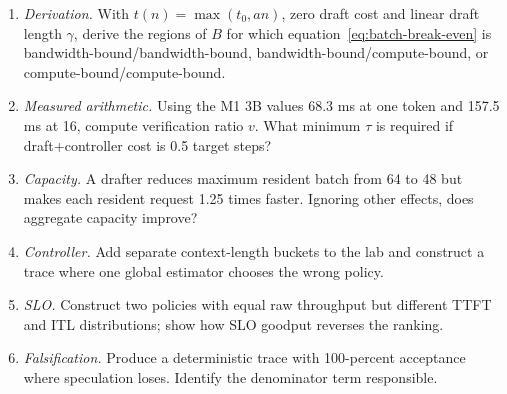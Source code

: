 \ExercisesSection
\begin{enumerate}
\item \emph{Derivation.} With $t(n)=\max(t_0,an)$, zero draft cost and linear draft
length $\gamma$, derive the regions of $B$ for which equation~\eqref{eq:batch-break-even}
is bandwidth-bound/bandwidth-bound, bandwidth-bound/compute-bound, or
compute-bound/compute-bound.
\item \emph{Measured arithmetic.} Using the M1 3B values 68.3 ms at one token and
157.5 ms at 16, compute verification ratio $v$. What minimum $\tau$ is required if
draft+controller cost is 0.5 target steps?
\item \emph{Capacity.} A drafter reduces maximum resident batch from 64 to 48 but makes
each resident request 1.25 times faster. Ignoring other effects, does aggregate capacity
improve?
\item \emph{Controller.} Add separate context-length buckets to the lab and construct a
trace where one global estimator chooses the wrong policy.
\item \emph{SLO.} Construct two policies with equal raw throughput but different TTFT
and ITL distributions; show how SLO goodput reverses the ranking.
\item \emph{Falsification.} Produce a deterministic trace with 100-percent acceptance
where speculation loses. Identify the denominator term responsible.
\end{enumerate}


